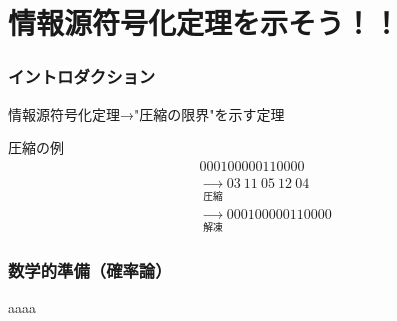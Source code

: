 \documentclass{classes/myslide}
\begin{document}
\section{情報源符号化定理を示そう！！}

\begin{frame}\frametitle{イントロダクション}

  情報源符号化定理→"圧縮の限界"を示す定理

  \begin{exampleblock}{圧縮の例}
    \begin{align*}
      &000100000110000 \\
      &\xrightarrow[圧縮]{} 03 \ 11 \ 05 \ 12 \ 04 \\
      &\xrightarrow[解凍]{} 000100000110000 
    \end{align*}
  \end{exampleblock}

\end{frame}

\begin{frame}\frametitle{数学的準備（確率論）}
  aaaa
\end{frame}
\end{document}
